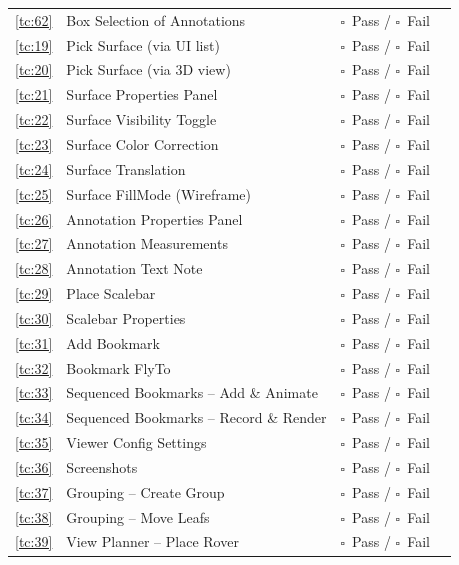 \documentclass[a4paper,11pt]{article}
\newcommand{\checkbox}{$\square$}
\begin{document}
\begin{longtable}{p{1.8cm} p{6.5cm} p{2.5cm} p{2.5cm}}
		\ref{tc:62} & Box Selection of Annotations & \checkbox~Pass / \checkbox~Fail & \\
		\ref{tc:19} & Pick Surface (via UI list) & \checkbox~Pass / \checkbox~Fail & \\
		\ref{tc:20} & Pick Surface (via 3D view) & \checkbox~Pass / \checkbox~Fail & \\
		\ref{tc:21} & Surface Properties Panel & \checkbox~Pass / \checkbox~Fail & \\
		\ref{tc:22} & Surface Visibility Toggle & \checkbox~Pass / \checkbox~Fail & \\
		\ref{tc:23} & Surface Color Correction & \checkbox~Pass / \checkbox~Fail & \\
		\ref{tc:24} & Surface Translation & \checkbox~Pass / \checkbox~Fail & \\
		\ref{tc:25} & Surface FillMode (Wireframe) & \checkbox~Pass / \checkbox~Fail & \\
		\ref{tc:26} & Annotation Properties Panel & \checkbox~Pass / \checkbox~Fail & \\
		\ref{tc:27} & Annotation Measurements & \checkbox~Pass / \checkbox~Fail & \\
		\ref{tc:28} & Annotation Text Note & \checkbox~Pass / \checkbox~Fail & \\
		\ref{tc:29} & Place Scalebar & \checkbox~Pass / \checkbox~Fail & \\
		\ref{tc:30} & Scalebar Properties & \checkbox~Pass / \checkbox~Fail & \\
		\ref{tc:31} & Add Bookmark & \checkbox~Pass / \checkbox~Fail & \\
		\ref{tc:32} & Bookmark FlyTo & \checkbox~Pass / \checkbox~Fail & \\
		\ref{tc:33} & Sequenced Bookmarks -- Add \& Animate & \checkbox~Pass / \checkbox~Fail & \\
		\ref{tc:34} & Sequenced Bookmarks -- Record \& Render & \checkbox~Pass / \checkbox~Fail & \\
		\ref{tc:35} & Viewer Config Settings & \checkbox~Pass / \checkbox~Fail & \\
		\ref{tc:36} & Screenshots & \checkbox~Pass / \checkbox~Fail & \\
		\ref{tc:37} & Grouping -- Create Group & \checkbox~Pass / \checkbox~Fail & \\
		\ref{tc:38} & Grouping -- Move Leafs & \checkbox~Pass / \checkbox~Fail & \\
		\ref{tc:39} & View Planner -- Place Rover & \checkbox~Pass / \checkbox~Fail & \\

\end{longtable}
\end{document}
